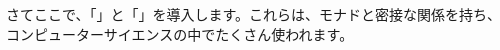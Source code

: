 \documentclass[
		head_space=20mm,
		foot_space=20mm,
		gutter=10mm,
		line_length=190mm
]{jlreq}
\begin{document}







	


\clearpage

さてここで、「」と「」を導入します。これらは、モナドと密接な関係を持ち、コンピューターサイエンスの中でたくさん使われます。
\end{document}
